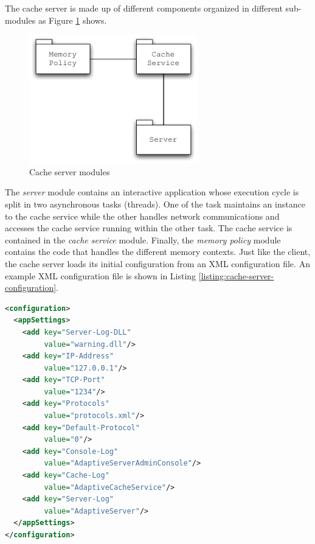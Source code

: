 \documentclass[11pt,a4paper]{article}
\begin{document}
The cache server is made up of different components organized in different sub-modules as Figure \ref{figure:cache-server-modules} shows.

\begin{figure}
\begin{center}
\includegraphics[width=0.65\textwidth]{figures/Cache-Server-Modules.pdf}
\caption{Cache server modules}
\label{figure:cache-server-modules}
\end{center}
\end{figure}

The \emph{server} module contains an interactive application whose execution cycle is split in two asynchronous tasks (threads). One of the task maintains an instance to the cache service while the other handles network communications and accesses the cache service running within the other task. The cache service is contained in the \emph{cache service} module. Finally, the \emph{memory policy} module contains the code that handles the different memory contexts. Just like the client, the cache server loads its initial configuration from an XML configuration file. An example XML configuration file is shown in Listing \ref{listing:cache-server-configuration}.

\begin{lstlisting}[language=XML,caption=Cache server XML configuration file,label=listing:cache-server-configuration,float]
<configuration>
  <appSettings>
    <add key="Server-Log-DLL"
         value="warning.dll"/>
    <add key="IP-Address"
         value="127.0.0.1"/>
    <add key="TCP-Port"
         value="1234"/>
    <add key="Protocols"
         value="protocols.xml"/>
    <add key="Default-Protocol"
         value="0"/>
    <add key="Console-Log"
         value="AdaptiveServerAdminConsole"/>
    <add key="Cache-Log"
         value="AdaptiveCacheService"/>
    <add key="Server-Log"
         value="AdaptiveServer"/>
  </appSettings>
</configuration>
\end{lstlisting}
\end{document}
